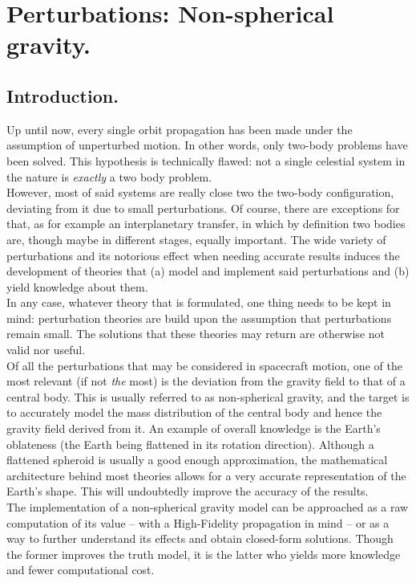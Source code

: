 \chapter{Perturbations: Non-spherical gravity.}
%
\label{chap:Chapter_4}
%
\section{Introduction.}
%
\indent Up until now, every single orbit propagation has been made under the assumption of unperturbed motion. In other words, only two-body problems have been solved. This hypothesis is technically flawed: not a single celestial system in the nature is \textit{exactly} a two body problem. \\
%
\indent However, most of said systems are really close two the two-body configuration, deviating from it due to small perturbations. Of course, there are exceptions for that, as for example an interplanetary transfer, in which by definition two bodies are, though maybe in different stages, equally important. The wide variety of perturbations and its notorious effect when needing accurate results induces the development of theories that (a) model and implement said perturbations and (b) yield knowledge about them. \\
%
\indent In any case, whatever theory that is formulated, one thing needs to be kept in mind: perturbation theories are build upon the assumption that perturbations remain small. The solutions that these theories may return are otherwise not valid nor useful. \\
%
\indent Of all the perturbations that may be considered in spacecraft motion, one of the most relevant (if not \textit{the} most) is the deviation from the gravity field to that of a central body. This is usually referred to as non-spherical gravity, and the target is to accurately model the mass distribution of the central body and hence the gravity field derived from it. An example of overall knowledge is the Earth's oblateness (\ie the Earth being flattened in its rotation direction). Although a flattened spheroid is usually a good enough approximation, the mathematical architecture behind most theories allows for a very accurate representation of the Earth's shape. This will undoubtedly improve the accuracy of the results. \\
%
\indent The implementation of a non-spherical gravity model can be approached as a raw computation of its value -- with a High-Fidelity propagation in mind -- or as a way to further understand its effects and obtain closed-form solutions. Though the former improves the truth model, it is the latter who yields more knowledge and fewer computational cost.\\
